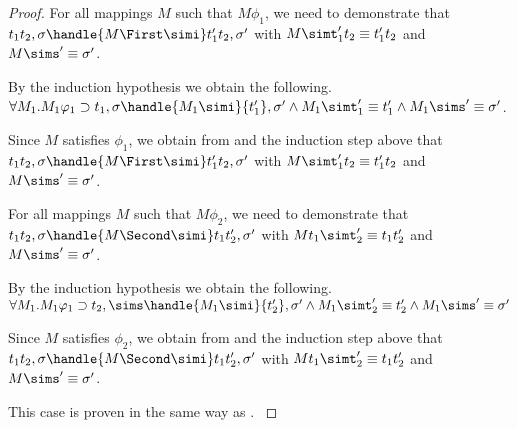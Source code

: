 \begin{proof}
  {For all mappings $M$ such that $M\phi_1$, we need to demonstrate that\\
   $t_1\And t_2,\sigma\handle{M\First \simi}t_1'\And t_2,\sigma'$ with
   $M \simt_1'\And t_2\equiv {t_1'}\And t_2$ and $M\sims'\equiv {\sigma'}$.

   By the induction hypothesis we obtain the following.\\
   $\forall M_1 . M_1 \phi_1 \implies t_1,\sigma \handle{M_1 \simi} {t_1'},{\sigma'}\land M_1 \simt_1'\equiv{t_1'}\land M_1\sims' \equiv {\sigma'}$.

   Since $M$ satisfies $\phi_1$, we obtain from  and the induction step above that
   $t_1\And t_2,\sigma\handle{M\First \simi}t_1'\And t_2,\sigma'$ with
   $M \simt_1'\And t_2\equiv {t_1'}\And t_2$ and $M\sims'\equiv {\sigma'}$.


   For all mappings $M$ such that $M\phi_2$, we need to demonstrate that
   $t_1\And t_2,\sigma\handle{M\Second \simi}t_1\And t_2',\sigma'$ with
   $M t_1\And \simt_2'\equiv t_1\And t_2'$ and $M\sims'\equiv {\sigma'}$.

  By the induction hypothesis we obtain the following.\\
  $\forall M_1 . M_1 \phi_1 \implies t_2,\sims \handle{M_1 \simi} {t_2'},{\sigma'}\land M_1 \simt_2'\equiv{t_2'}\land M_1\sims' \equiv {\sigma'}$

  Since $M$ satisfies $\phi_2$, we obtain from  and the induction step above that
  $t_1\And t_2,\sigma\handle{M\Second \simi}t_1\And t_2',\sigma'$ with
  $M t_1\And \simt_2'\equiv t_1\And t_2'$ and $M\sims'\equiv {\sigma'}$.
  }

  {This case is proven in the same way as .
  }


\end{proof}


